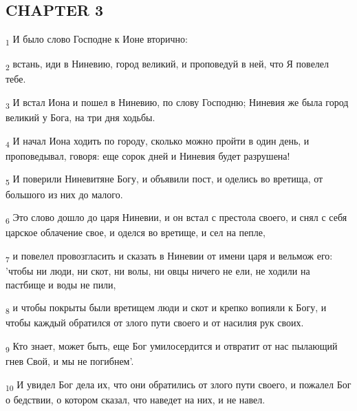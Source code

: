 \subsection{CHAPTER 3}
\begin{tcolorbox}
\textsubscript{1} И было слово Господне к Ионе вторично:
\end{tcolorbox}
\begin{tcolorbox}
\textsubscript{2} встань, иди в Ниневию, город великий, и проповедуй в ней, что Я повелел тебе.
\end{tcolorbox}
\begin{tcolorbox}
\textsubscript{3} И встал Иона и пошел в Ниневию, по слову Господню; Ниневия же была город великий у Бога, на три дня ходьбы.
\end{tcolorbox}
\begin{tcolorbox}
\textsubscript{4} И начал Иона ходить по городу, сколько можно пройти в один день, и проповедывал, говоря: еще сорок дней и Ниневия будет разрушена!
\end{tcolorbox}
\begin{tcolorbox}
\textsubscript{5} И поверили Ниневитяне Богу, и объявили пост, и оделись во вретища, от большого из них до малого.
\end{tcolorbox}
\begin{tcolorbox}
\textsubscript{6} Это слово дошло до царя Ниневии, и он встал с престола своего, и снял с себя царское облачение свое, и оделся во вретище, и сел на пепле,
\end{tcolorbox}
\begin{tcolorbox}
\textsubscript{7} и повелел провозгласить и сказать в Ниневии от имени царя и вельмож его: 'чтобы ни люди, ни скот, ни волы, ни овцы ничего не ели, не ходили на пастбище и воды не пили,
\end{tcolorbox}
\begin{tcolorbox}
\textsubscript{8} и чтобы покрыты были вретищем люди и скот и крепко вопияли к Богу, и чтобы каждый обратился от злого пути своего и от насилия рук своих.
\end{tcolorbox}
\begin{tcolorbox}
\textsubscript{9} Кто знает, может быть, еще Бог умилосердится и отвратит от нас пылающий гнев Свой, и мы не погибнем'.
\end{tcolorbox}
\begin{tcolorbox}
\textsubscript{10} И увидел Бог дела их, что они обратились от злого пути своего, и пожалел Бог о бедствии, о котором сказал, что наведет на них, и не навел.
\end{tcolorbox}
